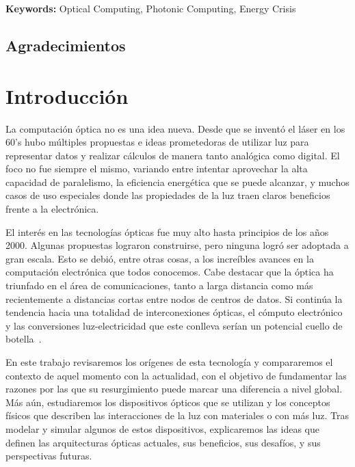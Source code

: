 \documentclass[12pt,a4paper]{report}
\begin{document}
\vspace{1cm}
\noindent\textbf{Keywords:}
Optical Computing, Photonic Computing, Energy Crisis

\clearpage

\section*{Agradecimientos}


\clearpage

\tableofcontents
\clearpage

\chapter{Introducción}

La computación óptica no es una idea nueva. Desde que se inventó el láser en los 60's hubo múltiples propuestas e ideas prometedoras de utilizar luz para representar datos y realizar cálculos de manera tanto analógica como digital. El foco no fue siempre el mismo, variando entre intentar aprovechar la alta capacidad de paralelismo, la eficiencia energética que se puede alcanzar, y muchos casos de uso especiales donde las propiedades de la luz traen claros beneficios frente a la electrónica.

El interés en las tecnologías ópticas fue muy alto hasta principios de los años 2000. Algunas propuestas lograron construirse, pero ninguna logró ser adoptada a gran escala. Esto se debió, entre otras cosas, a los increíbles avances en la computación electrónica que todos conocemos. Cabe destacar que la óptica ha triunfado en el área de comunicaciones, tanto a larga distancia como más recientemente a distancias cortas entre nodos de centros de datos. Si continúa la tendencia hacia una totalidad de interconexiones ópticas, el cómputo electrónico y las conversiones luz-electricidad que este conlleva serían un potencial cuello de botella~\cite{kissner2024}.

En este trabajo revisaremos los orígenes de esta tecnología y compararemos el contexto de aquel momento con la actualidad, con el objetivo de fundamentar las razones por las que su resurgimiento puede marcar una diferencia a nivel global. Más aún, estudiaremos los dispositivos ópticos que se utilizan y los conceptos físicos que describen las interacciones de la luz con materiales o con más luz. Tras modelar y simular algunos de estos dispositivos, explicaremos las ideas que definen las arquitecturas ópticas actuales, sus beneficios, sus desafíos, y sus perspectivas futuras.
\end{document}

